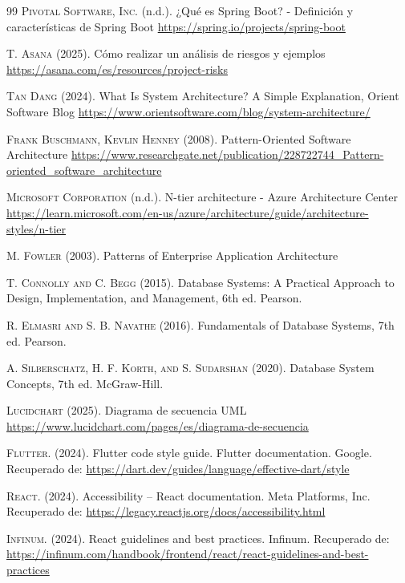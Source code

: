 \begin{thebibliography}{99}
\textsc{Pivotal Software, Inc.} (n.d.). ¿Qué es Spring Boot? - Definición y características de Spring Boot
\url{https://spring.io/projects/spring-boot}

\textsc{T. Asana} (2025). Cómo realizar un análisis de riesgos y ejemplos
\url{https://asana.com/es/resources/project-risks}

\textsc{Tan Dang} (2024). What Is System Architecture? A Simple Explanation, Orient Software Blog
\url{https://www.orientsoftware.com/blog/system-architecture/}

\textsc{Frank Buschmann, Kevlin Henney} (2008). Pattern-Oriented Software Architecture
\url{https://www.researchgate.net/publication/228722744_Pattern-oriented_software_architecture}

\textsc{Microsoft Corporation} (n.d.). N-tier architecture - Azure Architecture Center
\url{https://learn.microsoft.com/en-us/azure/architecture/guide/architecture-styles/n-tier}

\textsc{M. Fowler} (2003). Patterns of Enterprise Application Architecture

\textsc{T. Connolly and C. Begg} (2015). Database Systems: A Practical Approach to Design, Implementation, and Management, 6th ed. Pearson.

\textsc{R. Elmasri and S. B. Navathe} (2016). Fundamentals of Database Systems, 7th ed. Pearson.

\textsc{A. Silberschatz, H. F. Korth, and S. Sudarshan} (2020). Database System Concepts, 7th ed. McGraw-Hill.

\textsc{Lucidchart} (2025). Diagrama de secuencia UML
\url{ https://www.lucidchart.com/pages/es/diagrama-de-secuencia}

\textsc{Flutter.} (2024). Flutter code style guide. Flutter documentation. Google.
Recuperado de: \url{https://dart.dev/guides/language/effective-dart/style}

\textsc{React.} (2024). Accessibility – React documentation. Meta Platforms, Inc.
Recuperado de: \url{https://legacy.reactjs.org/docs/accessibility.html}

\textsc{Infinum.} (2024). React guidelines and best practices. Infinum.
Recuperado de: \url{https://infinum.com/handbook/frontend/react/react-guidelines-and-best-practices}

\end{thebibliography}